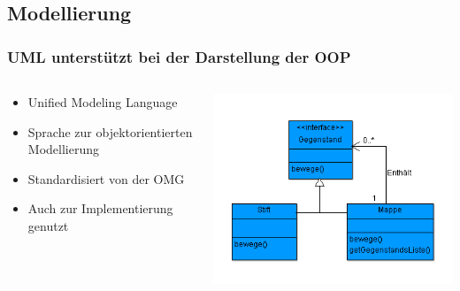 \begin{frame}
\begin{columns}
\begin{column}{.5\textwidth}
	    \end{column}
	\end{columns}
\end{frame}

\subsection{Modellierung}
\begin{frame}
\frametitle{UML unterst\"utzt bei der Darstellung der OOP}
	\begin{columns}
	    \begin{column}{.5\textwidth}
			\small
			\begin{itemize}
			  \item Unified Modeling Language
			  \item Sprache zur objektorientierten Modellierung
			  \item Standardisiert von der OMG
			  \item Auch zur Implementierung genutzt
			\end{itemize}
			\normalsize
	    \end{column}
	    \begin{column}{.5\textwidth}
	   		\center
	    	\includegraphics[width=1\textwidth,
	    	keepaspectratio=true]{bilder/uml_example.png}
	    \end{column}
	\end{columns} 
\end{frame} 
